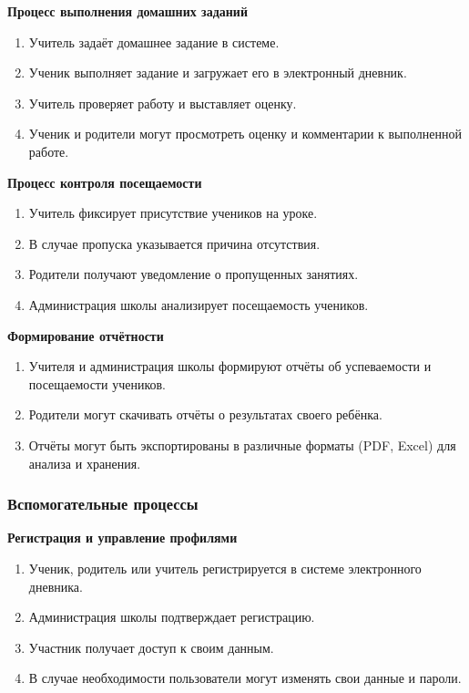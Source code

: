 \documentclass[a4paper, final]{article}
\begin{document}
\noindent \textbf{Процесс выполнения домашних заданий}
\begin{enumerate}
  \item Учитель задаёт домашнее задание в системе.
  \item Ученик выполняет задание и загружает его в электронный дневник.
  \item Учитель проверяет работу и выставляет оценку.
  \item Ученик и родители могут просмотреть оценку и комментарии к выполненной работе.
\end{enumerate}

\noindent \textbf{Процесс контроля посещаемости}
\begin{enumerate}
  \item Учитель фиксирует присутствие учеников на уроке.
  \item В случае пропуска указывается причина отсутствия.
  \item Родители получают уведомление о пропущенных занятиях.
  \item Администрация школы анализирует посещаемость учеников.
\end{enumerate}

\noindent \textbf{Формирование отчётности}
\begin{enumerate}
  \item Учителя и администрация школы формируют отчёты об успеваемости и посещаемости учеников.
  \item Родители могут скачивать отчёты о результатах своего ребёнка.
  \item Отчёты могут быть экспортированы в различные форматы (PDF, Excel) для анализа и хранения.
\end{enumerate}


\subsubsection{Вспомогательные процессы}
\noindent \textbf{Регистрация и управление профилями}
\begin{enumerate}
  \item Ученик, родитель или учитель регистрируется в системе электронного дневника.
  \item Администрация школы подтверждает регистрацию.
  \item Участник получает доступ к своим данным.
  \item В случае необходимости пользователи могут изменять свои данные и пароли.
\end{enumerate}
\end{document}
